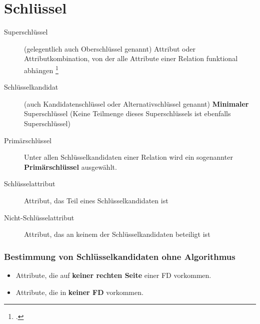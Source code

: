 \documentclass{lehramt-informatik-haupt}
\begin{document}
\let\ah=\liAttributHuelle
\let\m=\liAttributMenge

%

\chapter{Schlüssel}

\begin{description}
\item[Superschlüssel] (gelegentlich auch Oberschlüssel genannt) Attribut
oder Attributkombination, von der alle Attribute einer Relation
funktional abhängen
\footcite[Seite 181 Kapitel 6.2 „Superschlüssel“]{kemper}

\item[Schlüsselkandidat] (auch Kandidatenschlüssel oder
Alternativschlüssel genannt) \textbf{Minimaler} Superschlüssel (Keine
Teilmenge dieses Superschlüssels ist ebenfalls Superschlüssel)

\item[Primärschlüssel] Unter allen Schlüsselkandidaten einer
Relation wird ein sogenannter \textbf{Primärschlüssel} ausgewählt.

\item[Schlüsselattribut] Attribut, das Teil eines
Schlüsselkandidaten ist

\item[Nicht-Schlüsselattribut] Attribut, das an keinem der
Schlüsselkandidaten beteiligt ist
\end{description}

%

\subsection{Bestimmung von Schlüsselkandidaten ohne Algorithmus}

\begin{itemize}
\item Attribute, die auf \textbf{keiner rechten Seite} einer FD
vorkommen.

\item Attribute, die in \textbf{keiner FD} vorkommen.
\end{itemize}

%
\end{document}
